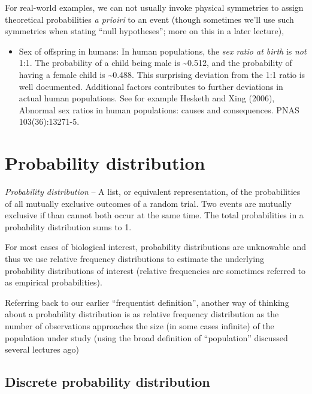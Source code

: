 \documentclass[]{book}
\providecommand{\tightlist}{%
  \setlength{\itemsep}{0pt}\setlength{\parskip}{0pt}}
\theoremstyle{definition}
\theoremstyle{definition}
\theoremstyle{definition}
\theoremstyle{remark}
\begin{document}
For real-world examples, we can not usually invoke physical symmetries
to assign theoretical probabilities \emph{a prioiri} to an event (though
sometimes we'll use such symmetries when stating ``null hypotheses'';
more on this in a later lecture),

\begin{itemize}
\tightlist
\item
  Sex of offspring in humans: In human populations, the \emph{sex ratio
  at birth} is \emph{not} 1:1. The probability of a child being male is
  \textasciitilde{}0.512, and the probability of having a female child
  is \textasciitilde{}0.488. This surprising deviation from the 1:1
  ratio is well documented. Additional factors contributes to further
  deviations in actual human populations. See for example Hesketh and
  Xing (2006), Abnormal sex ratios in human populations: causes and
  consequences. PNAS 103(36):13271-5.
\end{itemize}

\hypertarget{probability-distribution}{%
\section{Probability distribution}\label{probability-distribution}}

\emph{Probability distribution} -- A list, or equivalent representation,
of the probabilities of all mutually exclusive outcomes of a random
trial. Two events are mutually exclusive if than cannot both occur at
the same time. The total probabilities in a probability distribution
sums to 1.

For most cases of biological interest, probability distributions are
unknowable and thus we use relative frequency distributions to estimate
the underlying probability distributions of interest (relative
frequencies are sometimes referred to as empirical probabilities).

Referring back to our earlier ``frequentist definition'', another way of
thinking about a probability distribution is as relative frequency
distribution as the number of observations approaches the size (in some
cases infinite) of the population under study (using the broad
definition of ``population'' discussed several lectures ago)

\hypertarget{discrete-probability-distribution}{%
\subsection{Discrete probability
distribution}\label{discrete-probability-distribution}}
\end{document}
